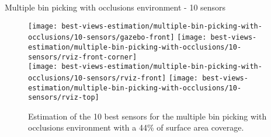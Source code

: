 \begin{frame}{Multiple bin picking with occlusions environment - 10 sensors}
	\begin{figure}
		\centering
		\texttt{[image: best-views-estimation/multiple-bin-picking-with-occlusions/10-sensors/gazebo-front]}\hspace{2em}
		\texttt{[image: best-views-estimation/multiple-bin-picking-with-occlusions/10-sensors/rviz-front-corner]}\\
		\texttt{[image: best-views-estimation/multiple-bin-picking-with-occlusions/10-sensors/rviz-front]}\hspace{1.5em}
		\texttt{[image: best-views-estimation/multiple-bin-picking-with-occlusions/10-sensors/rviz-top]}
		\caption{Estimation of the 10 best sensors for the multiple bin picking with occlusions environment with a 44\% of surface area coverage.}
	\end{figure}
\end{frame}
